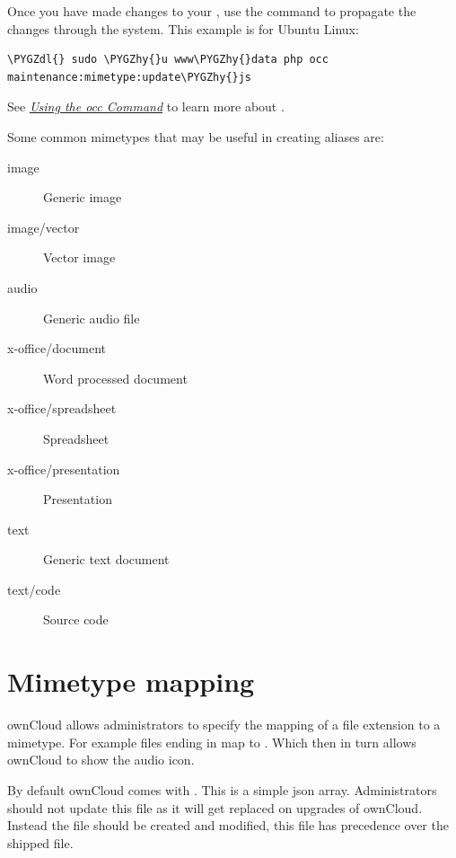 \documentclass[letterpaper,10pt,english]{sphinxmanual}
\def\PYGZdl{\char`\$}
\def\PYGZhy{\char`\-}
\begin{document}
Once you have made changes to your , use the 
command to propagate the changes through the system. This example is for
Ubuntu Linux:

\begin{Verbatim}[commandchars=\\\{\}]
\PYGZdl{} sudo \PYGZhy{}u www\PYGZhy{}data php occ maintenance:mimetype:update\PYGZhy{}js
\end{Verbatim}

See {\hyperref[configuration_server/occ_command::doc]{\emph{\emph{Using the occ Command}}}} to learn more about .

Some common mimetypes that may be useful in creating aliases are:
\begin{description}
\item[{image}] \leavevmode
Generic image

\item[{image/vector}] \leavevmode
Vector image

\item[{audio}] \leavevmode
Generic audio file

\item[{x-office/document}] \leavevmode
Word processed document

\item[{x-office/spreadsheet}] \leavevmode
Spreadsheet

\item[{x-office/presentation}] \leavevmode
Presentation

\item[{text}] \leavevmode
Generic text document

\item[{text/code}] \leavevmode
Source code

\end{description}


\section{Mimetype mapping}
\label{configuration_mimetypes/mimetype_mapping:mimetype-mapping}\label{configuration_mimetypes/mimetype_mapping::doc}
ownCloud allows administrators to specify the mapping of a file extension to a
mimetype. For example files ending in  map to . Which
then in turn allows ownCloud to show the audio icon.

By default ownCloud comes with . This is a
simple json array.
Administrators should not update this file as it will get replaced on upgrades
of ownCloud. Instead the file  should be created and
modified, this file has precedence over the shipped file.
\end{document}
